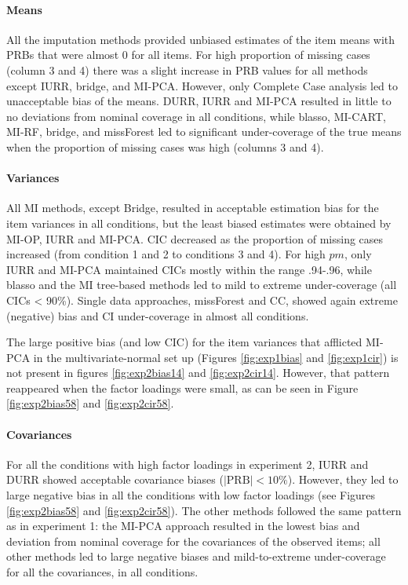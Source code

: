 	\paragraph{Means}
	All the imputation methods provided unbiased estimates of the item means with PRBs that were almost 0 
	for all items.
	For high proportion of missing cases (column 3 and 4) there was a slight increase in PRB values for 
	all methods except IURR, bridge, and MI-PCA.
	However, only Complete Case analysis led to unacceptable bias of the means.
	DURR, IURR and MI-PCA resulted in little to no deviations from nominal coverage in all conditions, 
	while blasso, MI-CART, MI-RF, bridge, and missForest led to significant under-coverage of the true means when the 
	proportion of missing cases was high (columns 3 and 4).
	
	\paragraph{Variances}
	All MI methods, except Bridge, resulted in acceptable estimation bias for the item variances in all conditions, 
	but the least biased estimates were obtained by MI-OP, IURR and MI-PCA.
	CIC decreased as the proportion of missing cases increased (from condition 1 and 2 to conditions 3 and 4).
	For high $pm$, only IURR and MI-PCA maintained CICs mostly within the range .94-.96, while blasso and the MI tree-based 
	methods led to mild to extreme under-coverage (all CICs < 90\%).
	Single data approaches, missForest and CC, showed again extreme (negative) bias and CI under-coverage in 
	almost all conditions.

	The large positive bias (and low CIC) for the item variances that afflicted MI-PCA in the multivariate-normal set up 
	(Figures \ref{fig:exp1bias} and \ref{fig:exp1cir}) is not present in figures \ref{fig:exp2bias14} and \ref{fig:exp2cir14}.
	However, that pattern reappeared when the factor loadings were small, as can be seen in Figure \ref{fig:exp2bias58} 
	and \ref{fig:exp2cir58}.

	\paragraph{Covariances}
	For all the conditions with high factor loadings in experiment 2, IURR and DURR showed acceptable covariance biases 
	($|\text{PRB}|<10\%$).
	However, they led to large negative bias in all the conditions with low factor loadings (see Figures \ref{fig:exp2bias58} 
	and \ref{fig:exp2cir58}).
	The other methods followed the same pattern as in experiment 1: the MI-PCA approach resulted in the lowest 
	bias and deviation from nominal coverage for the covariances of the observed items; 
	all other methods led to large negative biases and mild-to-extreme under-coverage for all the covariances, 
	in all conditions.

